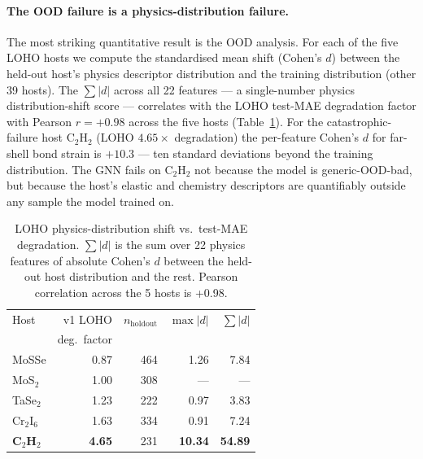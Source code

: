 \documentclass[11pt,a4paper]{article}
\begin{document}
\paragraph{The OOD failure is a physics-distribution failure.}
The most striking quantitative result is the OOD analysis. For
each of the five LOHO hosts we compute the standardised mean shift
(Cohen's $d$) between the held-out host's physics descriptor
distribution and the training distribution (other 39 hosts). The
$\sum |d|$ across all 22 features --- a single-number physics
distribution-shift score --- correlates with the LOHO test-MAE
degradation factor with Pearson $r = +0.98$ across the five hosts
(Table~\ref{tab:loho_physics_shift}). For the catastrophic-failure
host C$_2$H$_2$ (LOHO $4.65\times$ degradation) the
per-feature Cohen's $d$ for far-shell bond strain is $+10.3$ ---
ten standard deviations beyond the training distribution. The GNN
fails on C$_2$H$_2$ not because the model is generic-OOD-bad, but
because the host's elastic and chemistry descriptors are
quantifiably outside any sample the model trained on.

\begin{table}[h]
\centering
\caption{LOHO physics-distribution shift vs.\ test-MAE
degradation. $\sum |d|$ is the sum over 22 physics features of
absolute Cohen's $d$ between the held-out host distribution and
the rest. Pearson correlation across the 5 hosts is +0.98.}
\label{tab:loho_physics_shift}
\begin{tabular}{lrrrr}
\toprule
Host & v1 LOHO & $n_{\mathrm{holdout}}$ & $\max |d|$ & $\sum |d|$ \\
& deg.\ factor & & & \\
\midrule
MoSSe   & 0.87 & 464 & 1.26 & 7.84 \\
MoS$_2$ & 1.00 & 308 & ---  & --- \\
TaSe$_2$& 1.23 & 222 & 0.97 & 3.83 \\
Cr$_2$I$_6$ & 1.63 & 334 & 0.91 & 7.24 \\
\textbf{C$_2$H$_2$}    & \textbf{4.65} & 231 & \textbf{10.34} & \textbf{54.89} \\
\bottomrule
\end{tabular}
\end{table}
\end{document}
